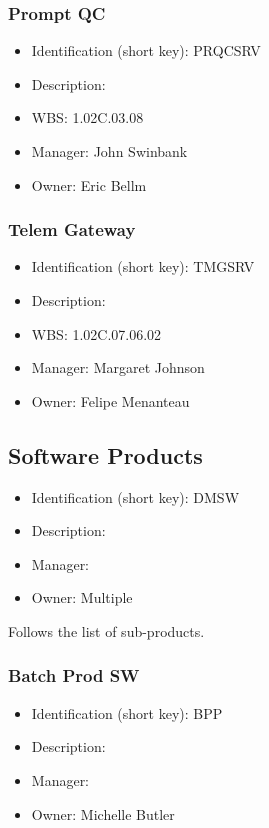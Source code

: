 \subsubsection{Prompt QC}\label{sect:PRQCSRV}
\begin{itemize}
\item Identification (short key): PRQCSRV
\item Description: 
\item WBS: 1.02C.03.08
\item Manager: John Swinbank
\item Owner: Eric Bellm
\end{itemize}

\subsubsection{Telem Gateway}\label{sect:TMGSRV}
\begin{itemize}
\item Identification (short key): TMGSRV
\item Description: 
\item WBS: 1.02C.07.06.02
\item Manager: Margaret Johnson
\item Owner: Felipe Menanteau
\end{itemize}

\subsection{Software Products}\label{sect:DMSW}
\begin{itemize}
\item Identification (short key): DMSW
\item Description: 
\item Manager: 
\item Owner: Multiple
\end{itemize}

Follows the list of sub-products.\subsubsection{Batch Prod SW}\label{sect:BPP}
\begin{itemize}
\item Identification (short key): BPP
\item Description: 
\item Manager: 
\item Owner: Michelle Butler
\end{itemize}

